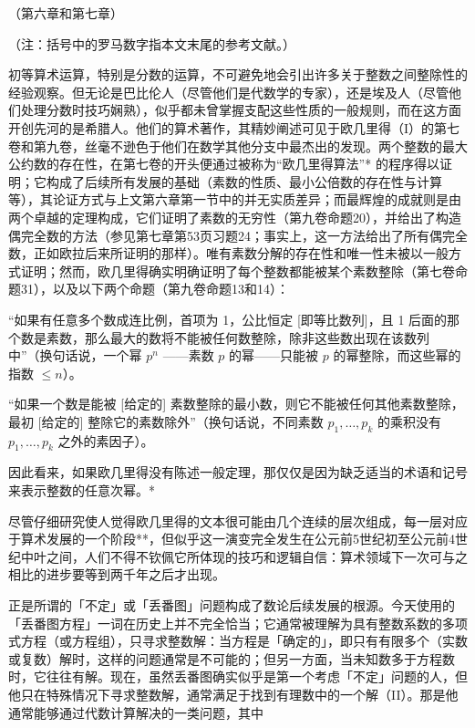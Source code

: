 
（第六章和第七章）

（注：括号中的罗马数字指本文末尾的参考文献。）

初等算术运算，特别是分数的运算，不可避免地会引出许多关于整数之间整除性的经验观察。但无论是巴比伦人（尽管他们是代数学的专家），还是埃及人（尽管他们处理分数时技巧娴熟），似乎都未曾掌握支配这些性质的一般规则，而在这方面开创先河的是希腊人。他们的算术著作，其精妙阐述可见于欧几里得（I）的第七卷和第九卷，丝毫不逊色于他们在数学其他分支中最杰出的发现。两个整数的最大公约数的存在性，在第七卷的开头便通过被称为“欧几里得算法”* 的程序得以证明；它构成了后续所有发展的基础（素数的性质、最小公倍数的存在性与计算等），其论证方式与上文第六章第一节中的并无实质差异；而最辉煌的成就则是由两个卓越的定理构成，它们证明了素数的无穷性（第九卷命题20），并给出了构造偶完全数的方法（参见第七章第53页习题24；事实上，这一方法给出了所有偶完全数，正如欧拉后来所证明的那样）。唯有素数分解的存在性和唯一性未被以一般方式证明；然而，欧几里得确实明确证明了每个整数都能被某个素数整除（第七卷命题31），以及以下两个命题（第九卷命题13和14）：

“如果有任意多个数成连比例，首项为 1，公比恒定 {[}即等比数列{]}，且 1 后面的那个数是素数，那么最大的数将不能被任何数整除，除非这些数出现在该数列中”（换句话说，一个幂 \(p^n\) ——素数 \(p\) 的幂——只能被 \(p\) 的幂整除，而这些幂的指数 \(\leqslant n\)）。

“如果一个数是能被 {[}给定的{]} 素数整除的最小数，则它不能被任何其他素数整除，最初 {[}给定的{]} 整除它的素数除外”（换句话说，不同素数 \(p_{1}, \ldots, p_{k}\) 的乘积没有 \(p_{1}, \ldots, p_{k}\) 之外的素因子）。

因此看来，如果欧几里得没有陈述一般定理，那仅仅是因为缺乏适当的术语和记号来表示整数的任意次幂。*

尽管仔细研究使人觉得欧几里得的文本很可能由几个连续的层次组成，每一层对应于算术发展的一个阶段**，但似乎这一演变完全发生在公元前5世纪初至公元前4世纪中叶之间，人们不得不钦佩它所体现的技巧和逻辑自信：算术领域下一次可与之相比的进步要等到两千年之后才出现。

正是所谓的「不定」或「丢番图」问题构成了数论后续发展的根源。今天使用的「丢番图方程」一词在历史上并不完全恰当；它通常被理解为具有整数系数的多项式方程（或方程组），只寻求整数解：当方程是「确定的」，即只有有限多个（实数或复数）解时，这样的问题通常是不可能的；但另一方面，当未知数多于方程数时，它往往有解。现在，虽然丢番图确实似乎是第一个考虑「不定」问题的人，但他只在特殊情况下寻求整数解，通常满足于找到有理数中的一个解（II）。那是他通常能够通过代数计算解决的一类问题，其中

